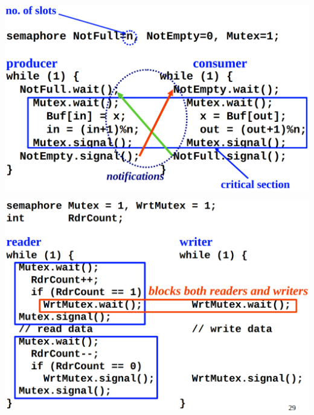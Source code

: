 \documentclass[a4paper, 12pt]{article}
\begin{document}
\begin{multicols*}{4}
\begin{center}
    \includegraphics[scale=0.13]{producer-consumer.png}    
\end{center}
\begin{center}
    \includegraphics[scale=0.14]{readers-writers.png}
\end{center}


\end{multicols*}
\end{document}
